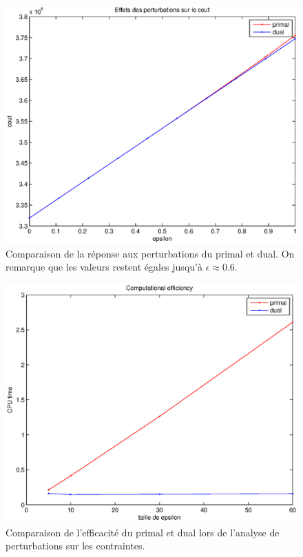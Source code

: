 \documentclass[12pt,oneside,a4paper]{article}
\begin{document}
\begin{figure}
  \begin{center}
    \includegraphics[scale=0.6]{img/responseToPerturbations.eps}
    \caption{Comparaison de la réponse aux perturbations du primal 
    et dual. On remarque que les valeurs restent égales jusqu'à 
    $\epsilon \approx 0.6$.}
    \label{fig:responseToPerturbations}
  \end{center}
\end{figure}

\begin{figure}
  \begin{center}
    \includegraphics[scale=0.6]{img/efficiencyDual.eps}
    \caption{Comparaison de l'efficacité du primal et dual lors de
    l'analyse de perturbations sur les contraintes.}
    \label{fig:efficiencyDual}
  \end{center}
\end{figure}
\end{document}
